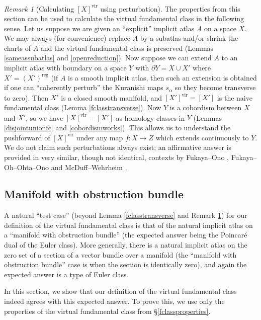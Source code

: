 \documentclass[12pt]{article}
\theoremstyle{definition}
\theoremstyle{remark}
\newtheorem{remark}[theorem]{Remark}
\numberwithin{equation}{subsection}
\newcommand{\vir}{\mathrm{vir}}
\newcommand{\reg}{\mathrm{reg}}
\begin{document}
\begin{remark}[{Calculating $[X]^\vir$ using perturbation}]\label{perturbationcalc}
The properties from this section can be used to calculate the virtual fundamental class in the following sense.  Let us suppose we are given an ``explicit'' implicit atlas $A$ on a space $X$.  We may always (for convenience) replace $A$ by a subatlas and/or shrink the charts of $A$ and the virtual fundamental class is preserved (Lemmas \ref{sameassubatlas} and \ref{openreduction}).  Now suppose we can extend $A$ to an implicit atlas with boundary on a space $Y$ with $\partial Y=X\cup X'$ where $X'=(X')^\reg$ (if $A$ is a smooth implicit atlas, then such an extension is obtained if one can ``coherently perturb'' the Kuranishi maps $s_\alpha$ so they become transverse to zero).  Then $X'$ is a closed smooth manifold, and $[X']^\vir=[X']$ is the naive fundamental class (Lemma \ref{fclasstransverse}).  Now $Y$ is a cobordism between $X$ and $X'$, so we have $[X]^\vir=[X']$ as homology classes in $Y$ (Lemmas \ref{disjointunionfc} and \ref{cobordismworks}).  This allows us to understand the pushforward of $[X]^\vir$ under any map $f:X\to Z$ which extends continuously to $Y$.  We do not claim such perturbations always exist; an affirmative answer is provided in very similar, though not identical, contexts by Fukaya--Ono \cite{fukayaono}, Fukaya--Oh--Ohta--Ono \cite{FOOOII,foootechnicaldetails} and McDuff--Wehrheim \cite{mcduffwehrheim}.
\end{remark}

\subsection{Manifold with obstruction bundle}\label{vfcobsbundspace}

A natural ``test case'' (beyond Lemma \ref{fclasstransverse} and Remark \ref{perturbationcalc}) for our definition of the virtual fundamental class is that of the natural implicit atlas on a ``manifold with obstruction bundle'' (the expected answer being the Poincar\'e dual of the Euler class).  More generally, there is a natural implicit atlas on the zero set of a section of a vector bundle over a manifold (the ``manifold with obstruction bundle'' case is when the section is identically zero), and again the expected answer is a type of Euler class.

In this section, we show that our definition of the virtual fundamental class indeed agrees with this expected answer.  To prove this, we use only the properties of the virtual fundamental class from \S\ref{fclassproperties}.
\end{document}
